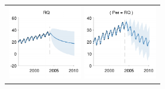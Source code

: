 \documentclass[twoside]{article}
\begin{document}
\begin{figure}[h!]
\centering
\newcommand{\wmg}{0.39\columnwidth}  %
\newcommand{\hmg}{3.2cm}  %
\begin{tabular}{c}
\hspace{-0.7cm} \includegraphics[width=\wmg,height=\hmg]{../figures/decomposition/11-Feb-v4-03-mauna2003-s_max_level_0/03-mauna2003-s_all_small} 
\hspace{-0.7cm} \includegraphics[width=\wmg,height=\hmg]{../figures/decomposition/11-Feb-v4-03-mauna2003-s_max_level_1/03-mauna2003-s_all_small}

\end{tabular}
\end{figure}
\end{document}
